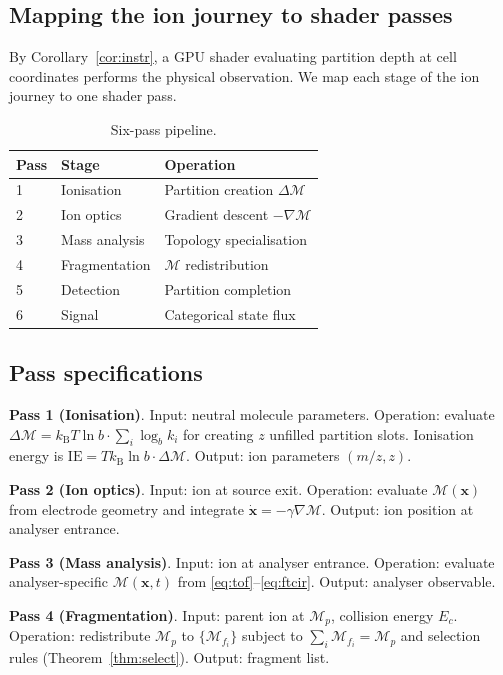 \documentclass[twocolumn,10pt,a4paper]{article}
\theoremstyle{thmstyle}
\theoremstyle{definition}
\theoremstyle{remark}
\newcommand{\kB}{k_{\mathrm{B}}}
\newcommand{\Depth}{\mathcal{M}}
\begin{document}
\subsection{Mapping the ion journey to shader passes}

By Corollary~\ref{cor:instr}, a GPU shader evaluating partition depth
at cell coordinates performs the physical observation. We map each
stage of the ion journey to one shader pass.

\begin{table}[H]
\centering
\caption{Six-pass pipeline.}
\label{tab:pipeline}
\small
\begin{tabular}{lll}
\toprule
\textbf{Pass} & \textbf{Stage} & \textbf{Operation} \\
\midrule
1 & Ionisation & Partition creation $\Delta\Depth$\\
2 & Ion optics & Gradient descent $-\nabla\Depth$\\
3 & Mass analysis & Topology specialisation\\
4 & Fragmentation & $\Depth$ redistribution\\
5 & Detection & Partition completion\\
6 & Signal & Categorical state flux\\
\bottomrule
\end{tabular}
\end{table}

\subsection{Pass specifications}

\textbf{Pass 1 (Ionisation)}. Input: neutral molecule parameters.
Operation: evaluate $\Delta\Depth=\kB T\ln b\cdot\sum_{i}\log_{b}k_{i}$
for creating $z$ unfilled partition slots. Ionisation energy is
$\mathrm{IE}=T\kB\ln b\cdot\Delta\Depth$. Output: ion parameters
$(m/z,z)$.

\textbf{Pass 2 (Ion optics)}. Input: ion at source exit. Operation:
evaluate $\Depth(\mathbf{x})$ from electrode geometry and integrate
$\dot{\mathbf{x}}=-\gamma\nabla\Depth$. Output: ion position at
analyser entrance.

\textbf{Pass 3 (Mass analysis)}. Input: ion at analyser entrance.
Operation: evaluate analyser-specific $\Depth(\mathbf{x},t)$ from
\eqref{eq:tof}--\eqref{eq:ftcir}. Output: analyser observable.

\textbf{Pass 4 (Fragmentation)}. Input: parent ion at $\Depth_{p}$,
collision energy $E_{c}$. Operation: redistribute $\Depth_{p}$ to
$\{\Depth_{f_{i}}\}$ subject to $\sum_{i}\Depth_{f_{i}}=\Depth_{p}$ and
selection rules (Theorem~\ref{thm:select}). Output: fragment list.
\end{document}
